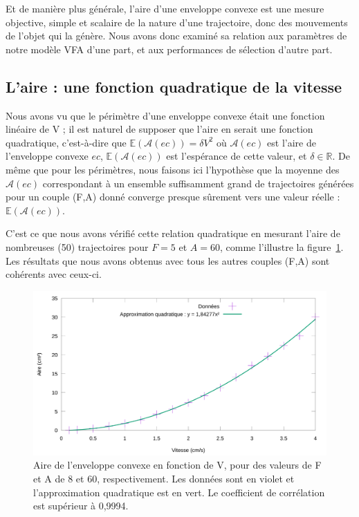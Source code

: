 	Et de manière plus générale, l'aire d'une enveloppe convexe est une mesure objective, simple et scalaire de la nature d'une trajectoire, donc des mouvements de l'objet qui la génère. Nous avons donc examiné sa relation aux paramètres de notre modèle VFA d'une part, et aux performances de sélection d'autre part.

	\subsection{L'aire : une fonction quadratique de la vitesse}
	Nous avons vu que le périmètre d'une enveloppe convexe était une fonction linéaire de V ; il est naturel de supposer que l'aire en serait une fonction quadratique, c'est-à-dire que $\mathbb{E}(\mathcal{A}(ec)) = \delta{}V^{2}$ où $\mathcal{A}(ec)$ est l'aire de l'enveloppe convexe $ec$, $\mathbb{E}(\mathcal{A}(ec))$ est l'espérance de cette valeur, et $\delta \in \mathbb{R}$. De même que pour les périmètres, nous faisons ici l'hypothèse que la moyenne des $\mathcal{A}(ec)$ correspondant à un ensemble suffisamment grand de trajectoires générées pour un couple (F,A) donné converge presque sûrement vers une valeur réelle : $\mathbb{E}(\mathcal{A}(ec))$.
	
	C'est ce que nous avons vérifié cette relation quadratique en mesurant l'aire de nombreuses (50) trajectoires pour $F = 5$ et $A = 60$, comme l'illustre la figure~\ref{fig:realAreaVspeed}. Les résultats que nous avons obtenus avec tous les autres couples (F,A) sont cohérents avec ceux-ci.

	\begin{figure}[!htbp]
		\centering
		\includegraphics[width=\textwidth]{figures/ch4/realAreaVspeed}
		\caption[Aire de l'enveloppe convexe en fonction de V]{Aire de l'enveloppe convexe en fonction de V, pour des valeurs de F et A de 8 et 60, respectivement. Les données sont en violet et l'approximation quadratique est en vert. Le coefficient de corrélation est supérieur à 0,9994.}
		\label{fig:realAreaVspeed}
	\end{figure}

